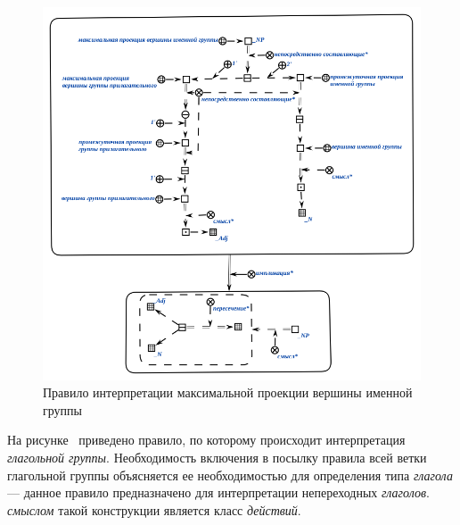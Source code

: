 \begin{figure}[h]
    \centering
    \includegraphics[scale=0.8]{images/part2/chapter_lang/d_sem_2}
    \caption{Правило интерпретации максимальной проекции вершины именной группы}
    \label{fig:d_sem_2}
\end{figure}

На рисунке~\textit{} приведено правило, по которому происходит интерпретация \textit{глагольной группы}.
Необходимость включения в посылку правила всей ветки глагольной группы объясняется ее необходимостью для определения типа \textit{глагола} --- данное правило предназначено для интерпретации непереходных \textit{глаголов}.
\textit{смыслом} такой конструкции является класс \textit{действий}.

